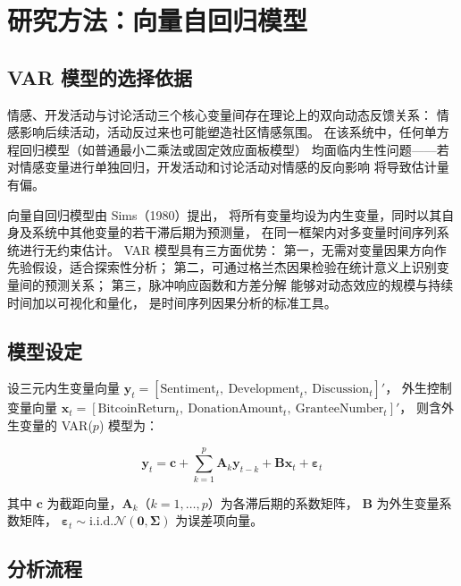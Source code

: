\section{研究方法：向量自回归模型}

\subsection{VAR 模型的选择依据}

情感、开发活动与讨论活动三个核心变量间存在理论上的双向动态反馈关系：
情感影响后续活动，活动反过来也可能塑造社区情感氛围。
在该系统中，任何单方程回归模型（如普通最小二乘法或固定效应面板模型）
均面临内生性问题——若对情感变量进行单独回归，开发活动和讨论活动对情感的反向影响
将导致估计量有偏。

向量自回归模型由 Sims（1980）\cite{sims1980macroeconomics}提出，
将所有变量均设为内生变量，同时以其自身及系统中其他变量的若干滞后期为预测量，
在同一框架内对多变量时间序列系统进行无约束估计。
VAR 模型具有三方面优势：
第一，无需对变量因果方向作先验假设，适合探索性分析；
第二，可通过格兰杰因果检验\cite{granger1969investigating}在统计意义上识别变量间的预测关系；
第三，脉冲响应函数和方差分解
能够对动态效应的规模与持续时间加以可视化和量化，
是时间序列因果分析的标准工具。

\subsection{模型设定}

设三元内生变量向量
$\mathbf{y}_t = [\text{Sentiment}_t,\ \text{Development}_t,\ \text{Discussion}_t]'$，
外生控制变量向量
$\mathbf{x}_t = [\text{BitcoinReturn}_t,\ \text{DonationAmount}_t,\ \text{GranteeNumber}_t]'$，
则含外生变量的 VAR($p$) 模型为：

\begin{equation}
\label{eq:var-model}
\mathbf{y}_t = \mathbf{c} + \sum_{k=1}^{p} \mathbf{A}_k \mathbf{y}_{t-k}
+ \mathbf{B} \mathbf{x}_t + \boldsymbol{\varepsilon}_t
\end{equation}

其中 $\mathbf{c}$ 为截距向量，$\mathbf{A}_k$（$k=1,\ldots,p$）为各滞后期的系数矩阵，
$\mathbf{B}$ 为外生变量系数矩阵，
$\boldsymbol{\varepsilon}_t \sim \text{i.i.d.} \mathcal{N}(\mathbf{0}, \boldsymbol{\Sigma})$
为误差项向量。

\subsection{分析流程}

